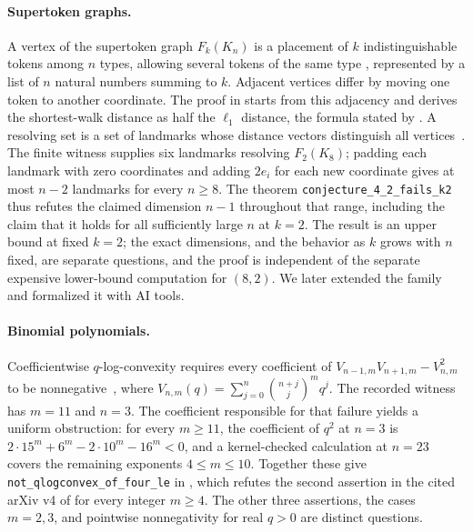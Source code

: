 \paragraph{Supertoken graphs.}
A vertex of the supertoken graph $F_k(K_n)$ is a placement of $k$ indistinguishable tokens among $n$ types, allowing several tokens of the same type \citep[Definition~2.1]{hammacksmith2017reducedpowers}, represented by a list of $n$ natural numbers summing to $k$. Adjacent vertices differ by moving one token to another coordinate. The proof in  starts from this adjacency and derives the shortest-walk distance as half the $\ell_1$ distance, the formula stated by \citet[Proposition~3.1(i), Eq.~(2)]{baskoro2025supertoken}. A resolving set is a set of landmarks whose distance vectors distinguish all vertices~\citep{harary1976metric,slater1975leaves}. The finite witness supplies six landmarks resolving $F_2(K_8)$; padding each landmark with zero coordinates and adding $2e_i$ for each new coordinate gives at most $n-2$ landmarks for every $n\ge8$. The theorem \texttt{conjecture\_4\_2\_fails\_k2} thus refutes the claimed dimension $n-1$ throughout that range, including the claim that it holds for all sufficiently large $n$ at $k=2$. The result is an upper bound at fixed $k=2$; the exact dimensions, and the behavior as $k$ grows with $n$ fixed, are separate questions, and the proof is independent of the separate expensive lower-bound computation for $(8,2)$. We later extended the family and formalized it with AI tools.

\paragraph{Binomial polynomials.}
Coefficientwise $q$-log-convexity requires every coefficient of $V_{n-1,m}V_{n+1,m}-V_{n,m}^2$ to be nonnegative~\citep{liuwang2007logconvexity}, where $V_{n,m}(q)=\sum_{j=0}^{n}\binom{n+j}{j}^{m}q^j$. The recorded witness has $m=11$ and $n=3$. The coefficient responsible for that failure yields a uniform obstruction: for every $m\ge11$, the coefficient of $q^2$ at $n=3$ is $2\cdot15^m+6^m-2\cdot10^m-16^m<0$, and a kernel-checked calculation at $n=23$ covers the remaining exponents $4\le m\le10$. Together these give \texttt{not\_qlogconvex\_of\_four\_le} in , which refutes the second assertion in the cited arXiv v4 of \citet{sun2025polynomials} for every integer $m\ge4$. The other three assertions, the cases $m=2,3$, and pointwise nonnegativity for real $q>0$ are distinct questions.


